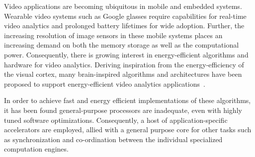 Video applications are becoming ubiquitous in mobile and embedded systems. Wearable video systems such as Google glasses require capabilities for real-time video analytics and prolonged battery lifetimes for wide adoption.  Further, the increasing resolution of image sensors in these mobile systems places an increasing demand on both the memory storage as well as the computational power. Consequently, there is growing interest in energy-efficient algorithms and hardware for video analytics. 
Deriving inspiration from the energy-efficiency of the visual cortex, many brain-inspired algorithms and architectures have been proposed to support energy-efficient video analytics applications~\cite{Nere2011,Chen2014,Kestur2012,Maashri2012a,Farabet}. %

In order to achieve fast and energy efficient implementations of these algorithms, it has been found general-purpose processors are inadequate, even with highly tuned software optimizations. Consequently, a host of application-specific accelerators are employed, allied with a general purpose core for other tasks such as synchronization and co-ordination between the individual specialized computation engines. 


